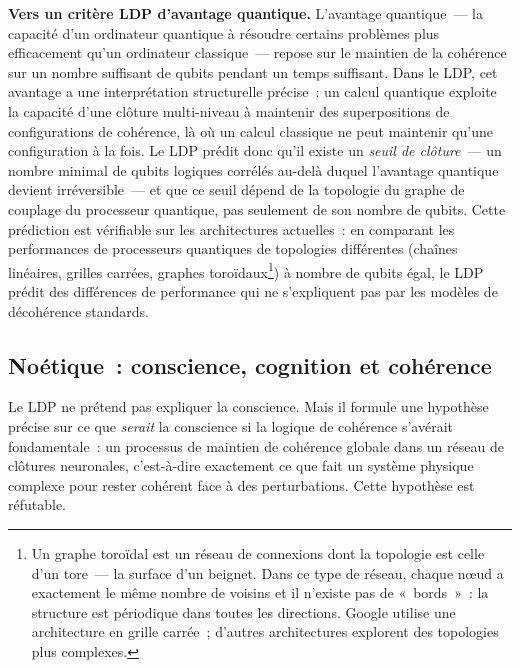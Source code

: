 \documentclass[12pt, a4paper, openright]{book}
\begin{document}
\textbf{Vers un critère LDP d'avantage quantique.} L'avantage quantique~--- la capacité d'un ordinateur quantique à résoudre certains problèmes plus efficacement qu'un ordinateur classique~--- repose sur le maintien de la cohérence sur un nombre suffisant de qubits pendant un temps suffisant. Dans le LDP, cet avantage a une interprétation structurelle précise~: un calcul quantique exploite la capacité d'une clôture multi-niveau à maintenir des superpositions de configurations de cohérence, là où un calcul classique ne peut maintenir qu'une configuration à la fois. Le LDP prédit donc qu'il existe un \emph{seuil de clôture}~--- un nombre minimal de qubits logiques corrélés au-delà duquel l'avantage quantique devient irréversible~--- et que ce seuil dépend de la topologie du graphe de couplage du processeur quantique, pas seulement de son nombre de qubits. Cette prédiction est vérifiable sur les architectures actuelles~: en comparant les performances de processeurs quantiques de topologies différentes (chaînes linéaires, grilles carrées, graphes toroïdaux\footnote{Un graphe toroïdal est un réseau de connexions dont la topologie est celle d'un tore~--- la surface d'un beignet. Dans ce type de réseau, chaque nœud a exactement le même nombre de voisins et il n'existe pas de «~bords~»~: la structure est périodique dans toutes les directions. Google utilise une architecture en grille carrée~; d'autres architectures explorent des topologies plus complexes.}) à nombre de qubits égal, le LDP prédit des différences de performance qui ne s'expliquent pas par les modèles de décohérence standards.

\subsection*{Noétique~: conscience, cognition et cohérence}

Le LDP ne prétend pas expliquer la conscience. Mais il formule une hypothèse précise sur ce que \emph{serait} la conscience si la logique de cohérence s'avérait fondamentale~: un processus de maintien de cohérence globale dans un réseau de clôtures neuronales, c'est-à-dire exactement ce que fait un système physique complexe pour rester cohérent face à des perturbations. Cette hypothèse est réfutable.

\medskip
\end{document}
